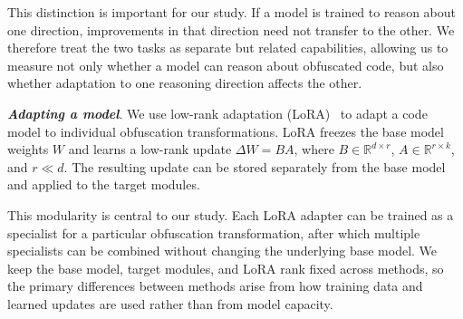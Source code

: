 This distinction is important for our study. If a model is trained to reason about one direction, improvements in that direction need not transfer to the other. We therefore treat the two tasks as separate but related capabilities, allowing us to measure not only whether a model can reason about obfuscated code, but also whether adaptation to one reasoning direction affects the other.

{\bf \em Adapting a model}. We use low-rank adaptation (LoRA)~\cite{lora} to adapt a code model to individual obfuscation transformations. LoRA freezes the base model weights $W$ and learns a low-rank update
$\Delta W = BA$, where $B \in \mathbb{R}^{d \times r}$, $A \in \mathbb{R}^{r \times k}$, and $r \ll d$. The resulting update can be stored separately from the base model and applied to the target modules.

This modularity is central to our study. Each LoRA adapter can be trained as a specialist for a particular obfuscation transformation, after which multiple specialists can be combined without changing the underlying base model. We keep the base model, target modules, and LoRA rank fixed across methods, so the primary differences between methods arise from how training data and learned updates are used rather than from model capacity.